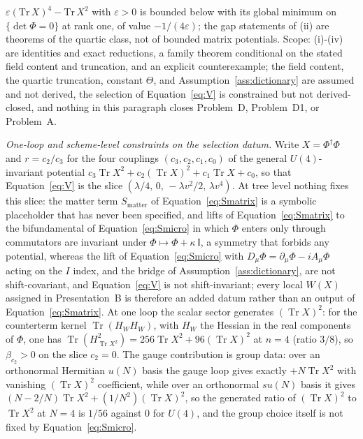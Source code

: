 \(\varepsilon(\mathrm{Tr}\,X)^4-\mathrm{Tr}\,X^2\) with \(\varepsilon>0\) is bounded below with its global minimum on \(\{\det\Phi=0\}\) at rank one, of value \(-1/(4\varepsilon)\); the gap statements of (ii) are theorems of the quartic class, not of bounded matrix potentials. Scope: (i)-(iv) are identities and exact reductions, a family theorem conditional on the stated field content and truncation, and an explicit counterexample; the field content, the quartic truncation, constant \(\Theta\), and Assumption~\ref{ass:dictionary} are assumed and not derived, the selection of Equation~\eqref{eq:V} is constrained but not derived-closed, and nothing in this paragraph closes Problem~D, Problem~D1, or Problem~A.

\emph{One-loop and scheme-level constraints on the selection datum.} Write \(X=\Phi^\dagger\Phi\) and \(r=c_2/c_3\) for the four couplings \((c_3,c_2,c_1,c_0)\) of the general \(U(4)\)-invariant potential \(c_3\operatorname{Tr}X^2+c_2(\operatorname{Tr}X)^2+c_1\operatorname{Tr}X+c_0\), so that Equation~\eqref{eq:V} is the slice \((\lambda/4,\,0,\,-\lambda v^2/2,\,\lambda v^4)\).
At tree level nothing fixes this slice: the matter term \(S_{\mathrm{matter}}\) of Equation~\eqref{eq:Smatrix} is a symbolic placeholder that has never been specified, and lifts of Equation~\eqref{eq:Smatrix} to the bifundamental of Equation~\eqref{eq:Smicro} in which \(\Phi\) enters only through commutators are invariant under \(\Phi\mapsto\Phi+\kappa\,\mathbb I\), a symmetry that forbids any potential, whereas the lift of Equation~\eqref{eq:Smicro} with \(D_\mu\Phi=\partial_\mu\Phi-iA_\mu\Phi\) acting on the \(I\) index, and the bridge of Assumption~\ref{ass:dictionary}, are not shift-covariant, and Equation~\eqref{eq:V} is not shift-invariant; every local \(W(X)\) assigned in Presentation~B is therefore an added datum rather than an output of Equation~\eqref{eq:Smatrix}.
At one loop the scalar sector generates \((\operatorname{Tr}X)^2\): for the counterterm kernel \(\operatorname{Tr}(H_WH_W)\), with \(H_W\) the Hessian in the real components of \(\Phi\), one has \(\operatorname{Tr}(H_{\operatorname{Tr}X^2}^2)=256\operatorname{Tr}X^2+96(\operatorname{Tr}X)^2\) at \(n=4\) (ratio \(3/8\)), so \(\beta_{c_2}>0\) on the slice \(c_2=0\).
The gauge contribution is group data: over an orthonormal Hermitian \(u(N)\) basis the gauge loop gives exactly \(+N\operatorname{Tr}X^2\) with vanishing \((\operatorname{Tr}X)^2\) coefficient, while over an orthonormal \(su(N)\) basis it gives \((N-2/N)\operatorname{Tr}X^2+(1/N^2)(\operatorname{Tr}X)^2\), so the generated ratio of \((\operatorname{Tr}X)^2\) to \(\operatorname{Tr}X^2\) at \(N=4\) is \(1/56\) against \(0\) for \(U(4)\), and the group choice itself is not fixed by Equation~\eqref{eq:Smicro}.

